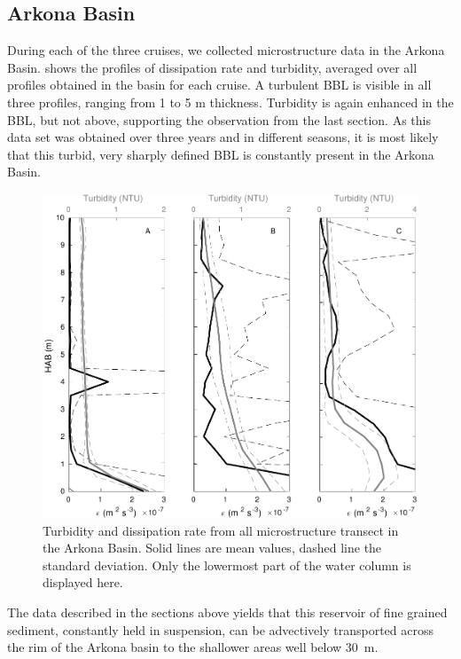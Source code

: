 \FloatBarrier
\subsection{Arkona Basin}

 During each of the three cruises, we collected microstructure data in the 
Arkona Basin.  shows the profiles of dissipation rate and turbidity, 
averaged over all profiles obtained in the basin for each cruise. A turbulent 
BBL is visible in all three profiles, ranging from 1 to 5 m thickness. 
Turbidity is again enhanced in the BBL, but not above, supporting the 
observation from the last section. As this data set was obtained over three 
years and in different seasons, it is most likely that this turbid, very 
sharply defined BBL is constantly present in the Arkona Basin.

   \begin{figure}[ht]
\includegraphics[width=15cm]{bilder/arkona_mss.pdf}
 \caption{Turbidity and dissipation rate from all microstructure transect in 
the Arkona Basin. Solid lines are mean values, dashed line the standard 
deviation. Only the lowermost part of the water column is displayed here.}
 \label{abmss}
 \end{figure}

The data described in the sections above yields that this reservoir of fine 
grained sediment, constantly held in suspension, can be advectively 
transported across the rim of the Arkona basin to the shallower areas well 
below 30~m. 

